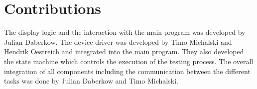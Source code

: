 \section{Contributions}
The display logic and the interaction with the main program was developed by Julian Daberkow. The device driver was developed by Timo Michalski and Hendrik Oestreich and integrated into the main program. They also developed the state machine which controls the execution of the testing process. The overall integration of all components including the communication between the different tasks was done by Julian Daberkow and Timo Michalski. 





